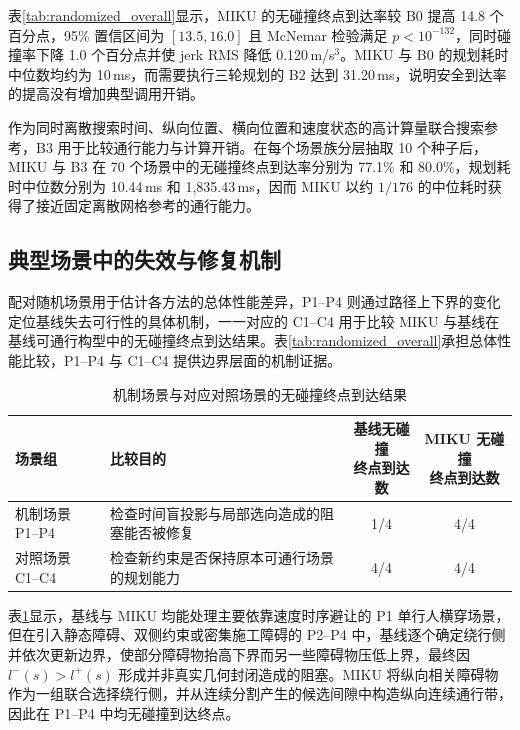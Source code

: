 \documentclass[a4paper,zihao=5]{ctexart}
\theoremstyle{definition}
\begin{document}
表\ref{tab:randomized_overall}显示，MIKU 的无碰撞终点到达率较 B0 提高 14.8 个百分点，95\% 置信区间为 $[13.5,16.0]$ 且 McNemar 检验满足 $p<10^{-132}$，同时碰撞率下降 1.0 个百分点并使 jerk RMS 降低 0.120\,m/s$^3$。MIKU 与 B0 的规划耗时中位数均约为 10\,ms，而需要执行三轮规划的 B2 达到 31.20\,ms，说明安全到达率的提高没有增加典型调用开销。

作为同时离散搜索时间、纵向位置、横向位置和速度状态的高计算量联合搜索参考，B3 用于比较通行能力与计算开销。在每个场景族分层抽取 10 个种子后，MIKU 与 B3 在 70 个场景中的无碰撞终点到达率分别为 77.1\% 和 80.0\%，规划耗时中位数分别为 10.44\,ms 和 1,835.43\,ms，因而 MIKU 以约 $1/176$ 的中位耗时获得了接近固定离散网格参考的通行能力。

\subsection{典型场景中的失效与修复机制}
\label{subsec:exp_passrate}

配对随机场景用于估计各方法的总体性能差异，P1--P4 则通过路径上下界的变化定位基线失去可行性的具体机制，一一对应的 C1--C4 用于比较 MIKU 与基线在基线可通行构型中的无碰撞终点到达结果。表\ref{tab:randomized_overall}承担总体性能比较，P1--P4 与 C1--C4 提供边界层面的机制证据。

\begin{table}[htbp]
\centering
\caption{机制场景与对应对照场景的无碰撞终点到达结果}
\label{tab:exp_pass}
\small
\begin{tabular}{l p{6.2cm} cc}
\toprule
\textbf{场景组} & \textbf{比较目的} & \shortstack{\textbf{基线无碰撞}\\\textbf{终点到达数}} & \shortstack{\textbf{MIKU 无碰撞}\\\textbf{终点到达数}} \\
\midrule
机制场景 P1--P4 & 检查时间盲投影与局部选向造成的阻塞能否被修复 & 1/4 & 4/4 \\
对照场景 C1--C4 & 检查新约束是否保持原本可通行场景的规划能力 & 4/4 & 4/4 \\
\bottomrule
\end{tabular}
\end{table}

表\ref{tab:exp_pass}显示，基线与 MIKU 均能处理主要依靠速度时序避让的 P1 单行人横穿场景，但在引入静态障碍、双侧约束或密集施工障碍的 P2--P4 中，基线逐个确定绕行侧并依次更新边界，使部分障碍物抬高下界而另一些障碍物压低上界，最终因 $l^-(s)>l^+(s)$ 形成并非真实几何封闭造成的阻塞。MIKU 将纵向相关障碍物作为一组联合选择绕行侧，并从连续分割产生的候选间隙中构造纵向连续通行带，因此在 P1--P4 中均无碰撞到达终点。
\end{document}

